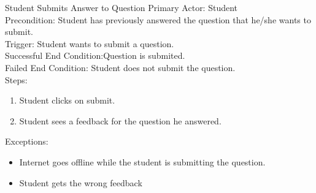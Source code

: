     \begin{section}{Student Submits Answer to Question}
    Primary Actor: Student\\
    Precondition: Student has previously answered the question that he/she wants to submit.\\
    Trigger: Student wants to submit a question.\\
    Successful End Condition:Question is submited.\\
    Failed End Condition: Student does not submit the question.\\
    Steps:
    \begin{enumerate}
    \item Student clicks on submit.
    \item Student sees a feedback for the question he answered.
    \end{enumerate}
    Exceptions:
    \begin{itemize}
    
    \item Internet goes offline while the student is submitting the question.
    \item Student gets the wrong feedback
    
    \end{itemize}
    \end{section}
    


